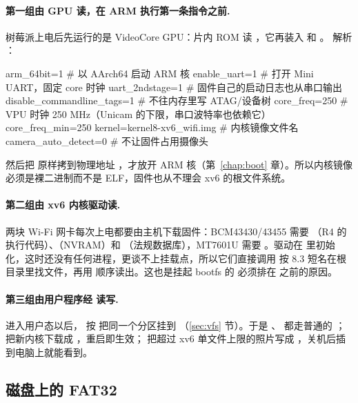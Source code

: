 \paragraph{第一组由 GPU 读，在 ARM 执行第一条指令之前.} 树莓派上电后先运行的是 VideoCore GPU：片内 ROM 读 ，它再装入  和 。 解析 ：

\begin{txtcode}
arm_64bit=1                   # 以 AArch64 启动 ARM 核
enable_uart=1                 # 打开 Mini UART，固定 core 时钟
uart_2ndstage=1               # 固件自己的启动日志也从串口输出
disable_commandline_tags=1    # 不往内存里写 ATAG/设备树
core_freq=250                 # VPU 时钟 250 MHz（Unicam 的下限，串口波特率也依赖它）
core_freq_min=250
kernel=kernel8-xv6_wifi.img   # 内核镜像文件名
camera_auto_detect=0          # 不让固件占用摄像头
\end{txtcode}

然后把  原样拷到物理地址 ，才放开 ARM 核（第~\ref{chap:boot} 章）。所以内核镜像必须是裸二进制而不是 ELF，固件也从不理会 xv6 的根文件系统。

\paragraph{第二组由 xv6 内核驱动读.} 两块 Wi-Fi 网卡每次上电都要由主机下载固件：BCM43430/43455 需要 （R4 的执行代码）、（NVRAM）和 （法规数据库），MT7601U 需要 。驱动在  里初始化，这时还没有任何进程，更谈不上挂载点，所以它们直接调用  按 8.3 短名在根目录里找文件，再用  顺序读出。这也是挂起 bootfs 的  必须排在  之前的原因。

\paragraph{第三组由用户程序经  读写.} 进入用户态以后， 按  把同一个分区挂到 （\ref{sec:vfs} 节）。于是 、 都走普通的 ； 把新内核下载成 ，重启即生效； 把超过 xv6 单文件上限的照片写成 ，关机后插到电脑上就能看到。

\subsection{磁盘上的 FAT32}

